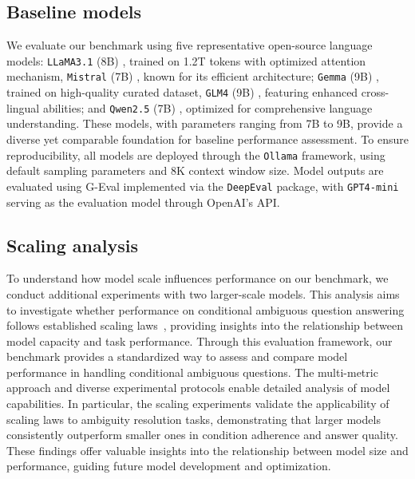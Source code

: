 \subsection{Baseline models}
We evaluate our benchmark using five representative open-source language models: \texttt{LLaMA3.1} (8B) \cite{dubey2024llama}, trained on 1.2T tokens with optimized attention mechanism, \texttt{Mistral} (7B) \cite{jiang2023mistral}, known for its efficient architecture; \texttt{Gemma} (9B) \cite{team2024gemma}, trained on high-quality curated dataset, \texttt{GLM4} (9B) \cite{glm2024chatglm}, featuring enhanced cross-lingual abilities; and \texttt{Qwen2.5} (7B) \cite{yang2024qwen2}, optimized for comprehensive language understanding. These models, with parameters ranging from 7B to 9B, provide a diverse yet comparable foundation for baseline performance assessment.
To ensure reproducibility, all models are deployed through the \texttt{Ollama} framework, using default sampling parameters and 8K context window size. Model outputs are evaluated using G-Eval implemented via the \texttt{DeepEval} package, with \texttt{GPT4-mini} serving as the evaluation model through OpenAI's API.

\subsection{Scaling analysis}
To understand how model scale influences performance on our benchmark, we conduct additional experiments with two larger-scale models. This analysis aims to investigate whether performance on conditional ambiguous question answering follows established scaling laws~\cite{kaplan2020scaling}, providing insights into the relationship between model capacity and task performance. Through this evaluation framework, our benchmark provides a standardized way to assess and compare model performance in handling conditional ambiguous questions. The multi-metric approach and diverse experimental protocols enable detailed analysis of model capabilities. In particular, the scaling experiments validate the applicability of scaling laws to ambiguity resolution tasks, demonstrating that larger models consistently outperform smaller ones in condition adherence and answer quality. These findings offer valuable insights into the relationship between model size and performance, guiding future model development and optimization.